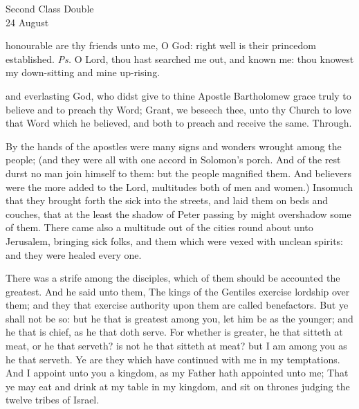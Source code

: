 \begin{inhead}
    {Second Class Double\\
24 August}
\end{inhead}

\introit
{} honourable are thy friends unto me, O God: right well is their princedom established. \textit{Ps.} O Lord, thou hast searched me out, and known me: thou knowest my down-sitting and mine up-rising.

\collect
{} and everlasting God, who didst give to thine Apostle Bartholomew grace truly to believe and to preach thy Word; Grant, we beseech thee, unto thy Church to love that Word which he believed, and both to preach and receive the same. Through.

 By the hands of the apostles were many signs and wonders wrought among the people; (and they were all with one accord in Solomon's porch. And of the rest durst no man join himself to them: but the people magnified them. And believers were the more added to the Lord, multitudes both of men and women.) Insomuch that they brought forth the sick into the streets, and laid them on beds and couches, that at the least the shadow of Peter passing by might overshadow some of them. There came also a multitude out of the cities round about unto Jerusalem, bringing sick folks, and them which were vexed with unclean spirits: and they were healed every one.


 There was a strife among the disciples, which of them should be accounted the greatest. And he said unto them, The kings of the Gentiles exercise lordship over them; and they that exercise authority upon them are called benefactors. But ye shall not be so: but he that is greatest among you, let him be as the younger; and he that is chief, as he that doth serve. For whether is greater, he that sitteth at meat, or he that serveth? is not he that sitteth at meat? but I am among you as he that serveth. Ye are they which have continued with me in my temptations. And I appoint unto you a kingdom, as my Father hath appointed unto me; That ye may eat and drink at my table in my kingdom, and sit on thrones judging the twelve tribes of Israel.

